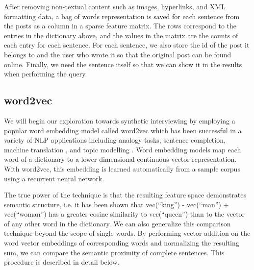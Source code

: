 \documentclass{sigchi}
\begin{document}
After removing non-textual content such as images, hyperlinks, and XML formatting data, a bag of words representation is saved for each sentence from the posts as a column in a sparse feature matrix. The rows correspond to the entries in the dictionary above, and the values in the matrix are the counts of each entry for each sentence. For each sentence, we also store the id of the post it belongs to and the user who wrote it so that the original post can be found online. Finally, we need the sentence itself so that we can show it in the results when performing the query.


\subsection{word2vec}

We will begin our exploration towards synthetic interviewing by employing a popular word embedding model called word2vec \cite{Mikolov2013,MikolovSCCD13} which has been successful in a variety of NLP applications including analogy tasks, sentence completion, machine translation \cite{W15-4908}, and topic modelling \cite{djuric2015hierarchical}. Word embedding models map each word of a dictionary to a lower dimensional continuous vector representation. With word2vec, this embedding is learned automatically from a sample corpus using a recurrent neural network. 

The true power of the technique is that the resulting feature space demonstrates semantic structure, i.e. it has been shown that vec(``king'') - vec(``man'') + vec(``woman'') has a greater cosine similarity to vec(``queen'') than to the vector of any other word in the dictionary. We can also generalize this comparison technique beyond the scope of single-words. By performing vector addition on the word vector embeddings of corresponding words and normalizing the resulting sum, we can compare the semantic proximity of complete sentences. This procedure is described in detail below.
\end{document}
